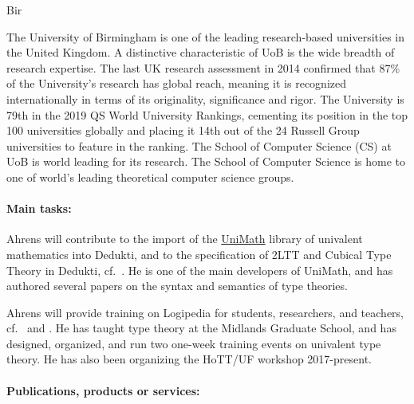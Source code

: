 \begin{sitedescription}{Bir}


The University of Birmingham is one of the leading research-based universities in the United Kingdom. A distinctive
characteristic of UoB is the wide breadth of research expertise. The last UK research assessment in 2014 confirmed that
87\% of the University’s research has global reach, meaning it is recognized internationally in terms of its originality, significance and rigor. The University is 79th in the 2019 QS World University Rankings, cementing its position in the top 100 universities globally and placing it 14th out of the 24 Russell Group universities to feature in the ranking. The School of Computer Science (CS) at UoB is world leading for its research. 
The School of Computer Science is home to one of world's leading theoretical computer science groups.

\paragraph*{Main tasks:}

\begin{compactitem}
\item Ahrens will contribute to the import of the \href{https://github.com/UniMath/UniMath}{UniMath} library of univalent mathematics into Dedukti, and to the specification of 2LTT and Cubical Type Theory in Dedukti, cf.\ . He is one of the main developers of UniMath, and has authored several papers on the syntax and semantics of type theories.
\item Ahrens will provide training on Logipedia for students, researchers, and teachers, cf.\  and .
He has taught type theory at the Midlands Graduate School, and has designed, organized, and run two one-week training events on univalent type theory. He has also been organizing the HoTT/UF workshop 2017-present.

\end{compactitem}

\paragraph*{Publications, products or services:}


\end{sitedescription}
